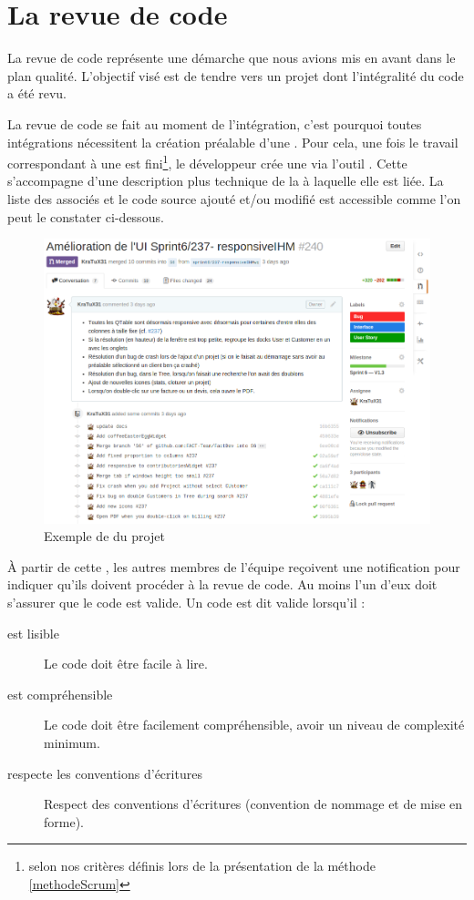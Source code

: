 \section{La revue de code}\label{revue}
La revue de code représente une démarche que nous avions mis en avant dans le plan qualité. L'objectif visé est de tendre vers un projet dont l'intégralité du code a été revu. 

La revue de code se fait au moment de l'intégration, c'est pourquoi toutes intégrations nécessitent la création préalable d'une \PullRequest. Pour cela, une fois le travail correspondant à une \UserStory{} est fini\footnote{selon nos critères définis lors de la présentation de la méthode \Scrum{} \ref{methodeScrum}}, le développeur crée une \PullRequest{} via l'outil \Github. Cette \PullRequest{} s'accompagne d'une description plus technique de la \UserStory{} à laquelle elle est liée. La liste des \Commits{} associés et le code source ajouté et/ou modifié est accessible comme l'on peut le constater ci-dessous. 
\begin{figure}[H]
	\centering
	\includegraphics[width=0.7\linewidth]{screens/creation_pr_github}
	\caption{Exemple de \PullRequest{} du projet \FactDev}
	\label{fig:creation_pr_github}
\end{figure}

\`A partir de cette \PullRequest, les autres membres de l'équipe reçoivent une notification pour indiquer qu'ils doivent procéder à la revue de code. Au moins l'un d'eux doit s'assurer que le code est valide. Un code est dit valide lorsqu'il :
\begin{description}
	\item[est lisible] Le code doit être facile à lire. 
	\item[est compréhensible] Le code doit être facilement compréhensible, avoir un niveau de complexité minimum.
	\item[respecte les conventions d'écritures] Respect des conventions d'écritures (convention de nommage et de mise en forme).
\end{description}


